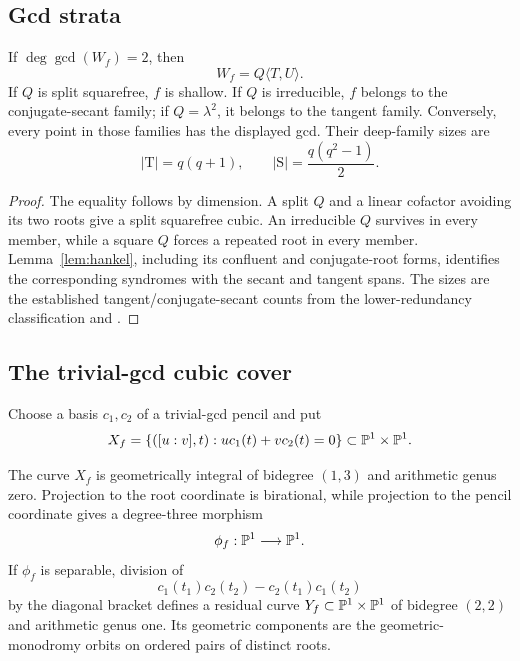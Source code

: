 \subsection{Gcd strata}

\begin{proposition}\label{prop:r5-gcd2}%
%
%
If $\deg\gcd(W_f)=2$, then
\[
       W_f=Q\langle T,U\rangle.
\]
If $Q$ is split squarefree, $f$ is shallow.  If $Q$ is irreducible,
$f$ belongs to the conjugate-secant family; if $Q=\lambda^2$, it
belongs to the tangent family.  Conversely, every point in those
families has the displayed gcd.  Their deep-family sizes are
\[
       |\mathrm T|=q(q+1),\qquad
       |\mathrm S|=\frac{q(q^2-1)}2.
\]
\end{proposition}

\begin{proof}
The equality follows by dimension.  A split $Q$ and a linear cofactor
avoiding its two roots give a split squarefree cubic.  An irreducible
$Q$ survives in every member, while a square $Q$ forces a repeated
root in every member.  Lemma~\ref{lem:hankel}, including its confluent
and conjugate-root forms, identifies the corresponding syndromes with
the secant and tangent spans.  The sizes are the established
tangent/conjugate-secant counts from the lower-redundancy
classification
\cite[Prop.~1]{Kaipa2017} and \cite[Thms.~I.4--I.6]{ZWK2020}.
\end{proof}

\subsection{The trivial-gcd cubic cover}

Choose a basis $c_1,c_2$ of a trivial-gcd pencil and put
\[
 X_f=\{([u:v],t):uc_1(t)+vc_2(t)=0\}
       \subset\mathbb P^1\times\mathbb P^1.
\]

\begin{proposition}
\label{prop:r5-incidence}%
%
The curve $X_f$ is geometrically integral of bidegree $(1,3)$ and
arithmetic genus zero.  Projection to the root coordinate is
birational, while projection to the pencil coordinate gives a
degree-three morphism
\[
       \phi_f:\mathbb P^1\longrightarrow\mathbb P^1.
\]
If $\phi_f$ is separable, division of
\[
 c_1(t_1)c_2(t_2)-c_2(t_1)c_1(t_2)
\]
by the diagonal bracket defines a residual curve
$Y_f\subset\mathbb P^1\times\mathbb P^1$ of bidegree $(2,2)$ and arithmetic genus
one.  Its geometric components are the geometric-monodromy orbits on
ordered pairs of distinct roots.
\end{proposition}

